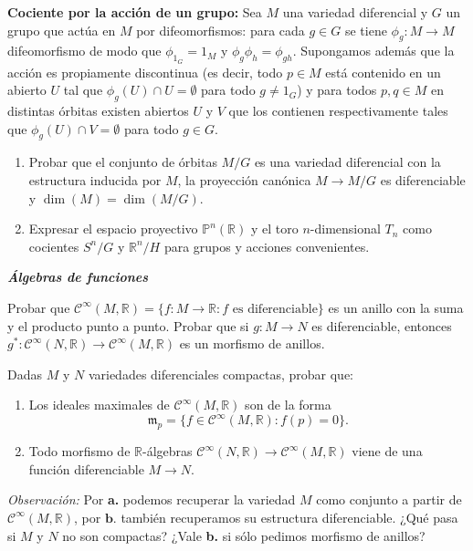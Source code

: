 \documentclass[11pt]{article}
\newcommand{\R}{{\mathbb{R}}}
\numberwithin{theorem}{subsection}
\begin{document}
\begin{question}
	\textbf{Cociente por la acci\'on de un grupo:} Sea $M$ una variedad diferencial y $G$ un grupo que act\'ua en $M$ por difeomorfismos: para cada $g\in G$ se tiene $\phi_g:M\to M$ difeomorfismo de modo que $\phi_{1_G}=1_M$ y $\phi_g\phi_h=\phi_{gh}$. Supongamos adem\'as que la acci\'on es propiamente discontinua (es decir, todo $p\in M$ est\'a contenido en un abierto $U$ tal que $\phi_g(U)\cap U=\emptyset$ para todo $g\neq 1_G$) y para todos $p,q\in M$ en distintas \'orbitas existen abiertos $U$ y $V$ que los contienen respectivamente tales que $\phi_g(U)\cap V = \emptyset$ para todo $g\in G$.
	\begin{enumerate}
		\item Probar que el conjunto de \'orbitas $M/G$ es una variedad diferencial con la estructura inducida por $M$, la proyecci\'on can\'onica $M\to M/G$ es diferenciable y $\dim(M)=\dim(M/G)$.
		\item Expresar el espacio proyectivo $\mathbb{P}^n(\R)$ y el toro $n$-dimensional $T_n$ como cocientes $S^n/G$ y $\R^n/H$ para grupos y acciones convenientes.
	\end{enumerate}
\end{question}

\textsl{\textbf{\'Algebras de funciones}}
\vspace{1em}


\begin{question}
	Probar que $\mathscr{C}^\infty(M,\R)=\{f:M\to\R:f\text{ es diferenciable}\}$ es un anillo con la suma y el producto punto a punto. Probar que si $g:M\to N$ es diferenciable, entonces $g^*:\mathscr{C}^\infty(N,\R)\to\mathscr{C}^\infty(M,\R)$ es un morfismo de anillos.
\end{question}

\begin{question}
	Dadas $M$ y $N$ variedades diferenciales compactas, probar que:
	\begin{enumerate}
		\item Los ideales maximales de $\mathscr{C}^\infty(M,\R)$ son de la forma $$\mathfrak{m}_p = \{f\in\mathscr{C}^\infty(M,\R): f(p)=0\}.$$
		\item Todo morfismo de $\R$-\'algebras $\mathscr{C}^\infty(N,\R)\to\mathscr{C}^\infty(M,\R)$ viene de una funci\'on diferenciable $M\to N$.
	\end{enumerate}
	\vspace{1em}
	
	
	\noindent \textit{Observaci\'on:} Por \textbf{a.} podemos recuperar la variedad $M$ como conjunto a partir de $\mathscr{C}^\infty(M,\R)$, por $\textbf{b.}$ tambi\'en recuperamos su estructura diferenciable. ¿Qu\'e pasa si $M$ y $N$ no son compactas? ¿Vale \textbf{b.} si s\'olo pedimos morfismo de anillos?
\end{question}
\end{document}

